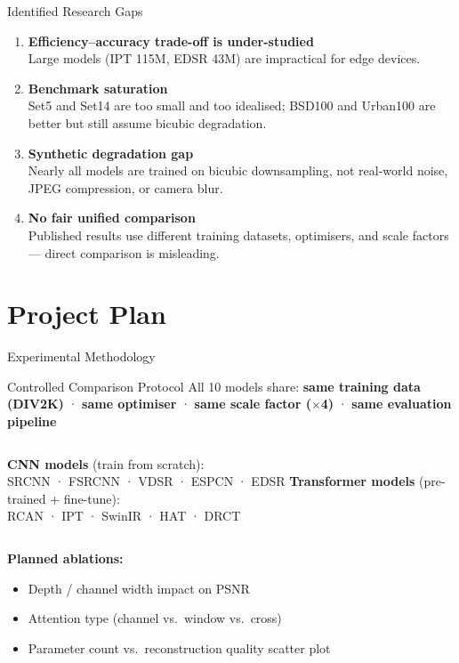 \documentclass[aspectratio=169]{beamer}
\begin{document}
\begin{frame}{Identified Research Gaps}
  \begin{enumerate}
    \item \textbf{Efficiency–accuracy trade-off is under-studied}\\
      Large models (IPT 115M, EDSR 43M) are impractical for edge devices.

    \vspace{6pt}
    \item \textbf{Benchmark saturation}\\
      Set5 and Set14 are too small and too idealised; BSD100 and Urban100 are better but still assume bicubic degradation.

    \vspace{6pt}
    \item \textbf{Synthetic degradation gap}\\
      Nearly all models are trained on bicubic downsampling, not real-world noise, JPEG compression, or camera blur.

    \vspace{6pt}
    \item \textbf{No fair unified comparison}\\
      Published results use different training datasets, optimisers, and scale factors — direct comparison is misleading.
  \end{enumerate}
\end{frame}

\section{Project Plan}

\begin{frame}{Experimental Methodology}
  \begin{block}{Controlled Comparison Protocol}
    All 10 models share: \textbf{same training data (DIV2K)} · \textbf{same optimiser} · \textbf{same scale factor ($\times$4)} · \textbf{same evaluation pipeline}
  \end{block}
  \vspace{8pt}
  \begin{columns}
      \textbf{CNN models} (train from scratch):\\
      SRCNN · FSRCNN · VDSR · ESPCN · EDSR
      \textbf{Transformer models} (pre-trained + fine-tune):\\
      RCAN · IPT · SwinIR · HAT · DRCT
  \end{columns}
  \vspace{10pt}
  \textbf{Planned ablations:}
  \begin{itemize}
    \item Depth / channel width impact on PSNR
    \item Attention type (channel vs.\ window vs.\ cross)
    \item Parameter count vs.\ reconstruction quality scatter plot
  \end{itemize}
\end{frame}
\end{document}
